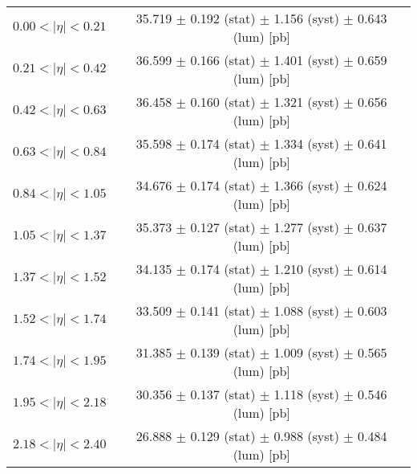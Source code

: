 \begin{tabular}{lc}
\hline
$0.00 < |\eta| <0.21$          & 35.719 $\pm$ 0.192 (stat) $\pm$ 1.156 (syst) $\pm$ 0.643 (lum) [pb]  \\
$0.21 < |\eta| <0.42$          & 36.599 $\pm$ 0.166 (stat) $\pm$ 1.401 (syst) $\pm$ 0.659 (lum) [pb]  \\
$0.42 < |\eta| <0.63$          & 36.458 $\pm$ 0.160 (stat) $\pm$ 1.321 (syst) $\pm$ 0.656 (lum) [pb]  \\
$0.63 < |\eta| <0.84$          & 35.598 $\pm$ 0.174 (stat) $\pm$ 1.334 (syst) $\pm$ 0.641 (lum) [pb]  \\
$0.84 < |\eta| <1.05$          & 34.676 $\pm$ 0.174 (stat) $\pm$ 1.366 (syst) $\pm$ 0.624 (lum) [pb]  \\
$1.05 < |\eta| <1.37$          & 35.373 $\pm$ 0.127 (stat) $\pm$ 1.277 (syst) $\pm$ 0.637 (lum) [pb]  \\
$1.37 < |\eta| <1.52$          & 34.135 $\pm$ 0.174 (stat) $\pm$ 1.210 (syst) $\pm$ 0.614 (lum) [pb]  \\
$1.52 < |\eta| <1.74$          & 33.509 $\pm$ 0.141 (stat) $\pm$ 1.088 (syst) $\pm$ 0.603 (lum) [pb]  \\
$1.74 < |\eta| <1.95$          & 31.385 $\pm$ 0.139 (stat) $\pm$ 1.009 (syst) $\pm$ 0.565 (lum) [pb]  \\
$1.95 < |\eta| <2.18$          & 30.356 $\pm$ 0.137 (stat) $\pm$ 1.118 (syst) $\pm$ 0.546 (lum) [pb]  \\
$2.18 < |\eta| <2.40$          & 26.888 $\pm$ 0.129 (stat) $\pm$ 0.988 (syst) $\pm$ 0.484 (lum) [pb]  \\
\hline
\end{tabular}
